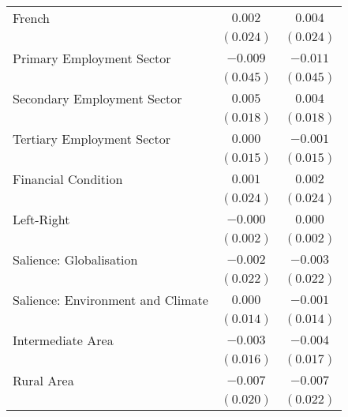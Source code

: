 \begin{center}
\begin{tiny}
\begin{longtable}{l@{} c@{} c@{}}
\quad French                                           & $0.002$          & $0.004$          \\
                                                       & $(0.024)$        & $(0.024)$        \\
\quad Primary Employment Sector                        & $-0.009$         & $-0.011$         \\
                                                       & $(0.045)$        & $(0.045)$        \\
\quad Secondary Employment Sector                      & $0.005$          & $0.004$          \\
                                                       & $(0.018)$        & $(0.018)$        \\
\quad Tertiary Employment Sector                       & $0.000$          & $-0.001$         \\
                                                       & $(0.015)$        & $(0.015)$        \\
\quad Financial Condition                              & $0.001$          & $0.002$          \\
                                                       & $(0.024)$        & $(0.024)$        \\
\quad Left-Right                                       & $-0.000$         & $0.000$          \\
                                                       & $(0.002)$        & $(0.002)$        \\
\quad Salience: Globalisation                          & $-0.002$         & $-0.003$         \\
                                                       & $(0.022)$        & $(0.022)$        \\
\quad Salience: Environment and Climate                & $0.000$          & $-0.001$         \\
                                                       & $(0.014)$        & $(0.014)$        \\
Intermediate Area                                      & $-0.003$         & $-0.004$         \\
                                                       & $(0.016)$        & $(0.017)$        \\
Rural Area                                             & $-0.007$         & $-0.007$         \\
                                                       & $(0.020)$        & $(0.022)$        \\

\end{longtable}
\end{tiny}
\end{center}
